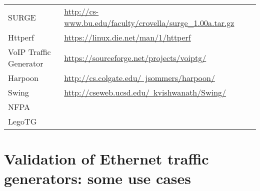 \begin{table}[ht!]
\begin{tabularx}{\textwidth}{@{}ll@{} p{10.0cm}}
SURGE                   & \href{http://cs-www.bu.edu/faculty/crovella/surge_1.00a.tar.gz}{http://cs-www.bu.edu/faculty/crovella/surge\_1.00a.tar.gz}                                                                                                \\
Httperf                 & \href{https://linux.die.net/man/1/httperf}{https://linux.die.net/man/1/httperf}                                                                                                                                           \\
VoIP Traffic Generator  &    \href{https://sourceforge.net/projects/voiptg/}{https://sourceforge.net/projects/voiptg/}                                                                                                                                                                                                                       \\
Harpoon                 & \href{http://cs.colgate.edu/~jsommers/harpoon/}{http://cs.colgate.edu/~jsommers/harpoon/}                                                                                                                                 \\
Swing                   & \href{http://cseweb.ucsd.edu/~kvishwanath/Swing/}{http://cseweb.ucsd.edu/~kvishwanath/Swing/}                                                                                                                             \\
NFPA                    &                                                                                                                                                                                                                           \\
LegoTG                  &                                                                                                                                                                                                                           \\ \bottomrule
\end{tabularx}
\end{table}



\section{Validation of Ethernet traffic generators: some use cases}




